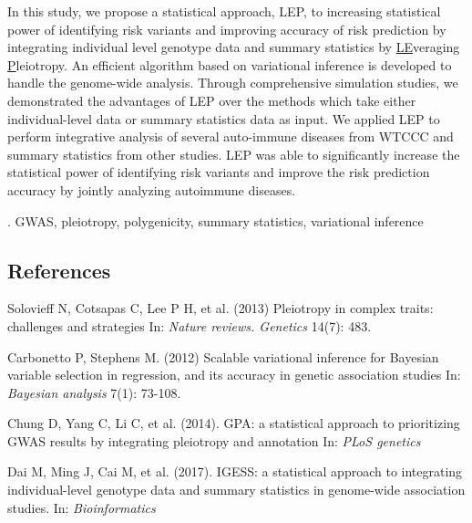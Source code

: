 \documentclass[12pt]{article}
\begin{document}
In this study, we propose a statistical approach, LEP, to increasing statistical power of identifying risk variants and improving accuracy of risk prediction by integrating individual level genotype data and summary statistics by \underline{LE}veraging \underline{P}leiotropy. An efficient algorithm based on variational inference is developed to handle the genome-wide analysis. Through comprehensive simulation studies, we demonstrated the advantages of LEP over the methods which take either individual-level data or summary statistics data as input. We applied LEP to perform integrative analysis of several auto-immune diseases from WTCCC and summary statistics from other studies. LEP was able to significantly increase the statistical power of identifying risk variants and improve the risk prediction accuracy by jointly analyzing autoimmune diseases.

\vskip 2mm

.
GWAS, pleiotropy, polygenicity, summary statistics, variational inference


\subsection*{References}

\begin{description}

\item
Solovieff N, Cotsapas C, Lee P H, et al. (2013)
Pleiotropy in complex traits: challenges and strategies
In: \textit{Nature reviews. Genetics} 14(7): 483.

\item
Carbonetto P, Stephens M. (2012)
Scalable variational inference for Bayesian variable selection in regression, and its accuracy in genetic association studies
In: \textit{Bayesian analysis} 7(1): 73-108.


\item
Chung D, Yang C, Li C, et al. (2014).
GPA: a statistical approach to prioritizing GWAS results by integrating pleiotropy and annotation
In: \textit{PLoS genetics}


\item
Dai M, Ming J, Cai M, et al.  (2017).
IGESS: a statistical approach to integrating individual-level genotype data and summary statistics in genome-wide association studies.
In: \textit{Bioinformatics}



\end{description}
\end{document}
